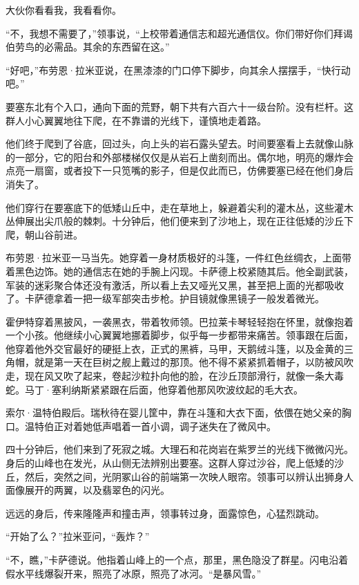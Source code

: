 \documentclass[AutoFakeBold=true]{book}
\begin{document}
大伙你看看我，我看看你。

``不，我想不需要了，''领事说，``上校带着通信志和超光通信仪。你们带好你们拜谒伯劳鸟的必需品。其余的东西留在这。''

``好吧，''布劳恩·拉米亚说，在黑漆漆的门口停下脚步，向其余人摆摆手，``快行动吧。''

\vspace*{1em}

要塞东北有个入口，通向下面的荒野，朝下共有六百六十一级台阶。没有栏杆。这群人小心翼翼地往下爬，在不靠谱的光线下，谨慎地走着路。

他们终于爬到了谷底，回过头，向上头的岩石露头望去。时间要塞看上去就像山脉的一部分，它的阳台和外部楼梯仅仅是从岩石上凿刻而出。偶尔地，明亮的爆炸会点亮一扇窗，或者投下一只笕嘴的影子，但是仅此而已，仿佛要塞已经在他们身后消失了。

他们穿行在要塞底下的低矮山丘中，走在草地上，躲避着尖利的灌木丛，这些灌木丛伸展出尖爪般的棘刺。十分钟后，他们便来到了沙地上，现在正往低矮的沙丘下爬，朝山谷前进。

布劳恩·拉米亚一马当先。她穿着一身材质极好的斗篷，一件红色丝绸衣，上面带着黑色边饰。她的通信志在她的手腕上闪现。卡萨德上校紧随其后。他全副武装，军装的迷彩聚合体还没有激活，所以看上去又哑光又黑，甚至把上面的光都吸收了。卡萨德拿着一把一级军部突击步枪。护目镜就像黑镜子一般发着微光。

霍伊特穿着黑披风，一袭黑衣，带着牧师领。巴拉莱卡琴轻轻抱在怀里，就像抱着一个小孩。他继续小心翼翼地挪着脚步，似乎每一步都带来痛苦。领事跟在后面，他穿着他外交官最好的硬挺上衣，正式的黑裤，马甲，天鹅绒斗篷，以及金黄的三角帽，就是第一天在巨树之舰上戴过的那顶。他不得不紧紧抓着帽子，以防被风吹走，现在风又吹了起来，卷起沙粒扑向他的脸，在沙丘顶部滑行，就像一条大毒蛇。马丁·塞利纳斯紧紧跟在后面，他穿着他那风吹波纹起的毛大衣。

索尔·温特伯殿后。瑞秋待在婴儿筐中，靠在斗篷和大衣下面，依偎在她父亲的胸口。温特伯正对着她低声唱着一首小调，调子迷失在了微风中。

四十分钟后，他们来到了死寂之城。大理石和花岗岩在紫罗兰的光线下微微闪光。身后的山峰也在发光，从山侧无法辨别出要塞。这群人穿过沙谷，爬上低矮的沙丘，然后，突然之间，光阴冢山谷的前端第一次映人眼帘。领事可以辨认出狮身人面像展开的两翼，以及翡翠色的闪光。

远远的身后，传来隆隆声和撞击声，领事转过身，面露惊色，心猛烈跳动。

``开始了么？''拉米亚问，``轰炸？''

``不，瞧，''卡萨德说。他指着山峰上的一个点，那里，黑色隐没了群星。闪电沿着假水平线爆裂开来，照亮了冰原，照亮了冰河。``是暴风雪。''
\end{document}

